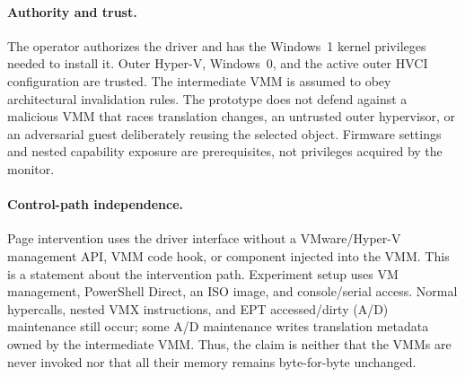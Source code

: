 \paragraph{Authority and trust.}
The operator authorizes the driver and has the Windows~1 kernel privileges
needed to install it. Outer Hyper-V, Windows~0, and the active outer HVCI
configuration are trusted. The intermediate VMM is assumed to obey architectural
invalidation rules. The prototype does not defend against a malicious VMM that
races translation changes, an untrusted outer hypervisor, or an adversarial
guest deliberately reusing the selected object. Firmware settings and nested
capability exposure are prerequisites, not privileges acquired by the monitor.

\paragraph{Control-path independence.}
Page intervention uses the \ks{} driver interface without a VMware/Hyper-V
management API, VMM code hook, or component injected into the VMM. This is a
statement about the intervention path. Experiment setup uses VM management,
PowerShell Direct, an ISO image, and console/serial access. Normal hypercalls,
nested VMX instructions, and EPT accessed/dirty (A/D) maintenance still occur;
some A/D maintenance writes translation metadata owned by the intermediate VMM.
Thus, the claim is neither that the VMMs are never invoked nor that all their
memory remains byte-for-byte unchanged.
